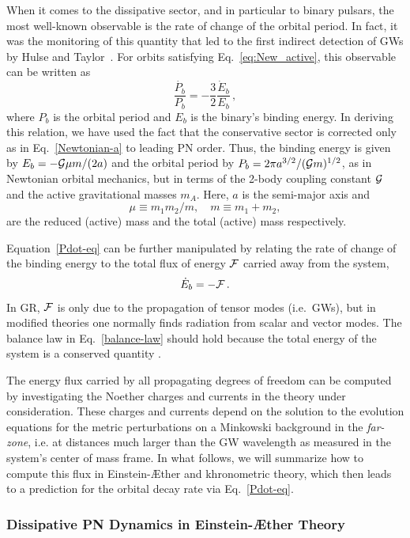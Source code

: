 \documentclass[prd,aps,twocolumn,nofootinbib,showpacs,superscriptaddress]{revtex4-1}
\newcommand\be{\begin{equation}}
\newcommand\ee{\end{equation}}
\begin{document}
When it comes to the dissipative sector, and in particular to binary pulsars, 
the most well-known observable is the rate of change
of the orbital period. In fact, it was the monitoring of this quantity that led to the 
first indirect detection of GWs by Hulse and 
Taylor~\cite{Hulse:1974eb,Taylor:1982zz,Taylor:1989sw}. For orbits satisfying Eq.~\eqref{eq:New_active}, this observable can be written as
%
\be
\label{Pdot-eq}
\frac{\dot{P_{b}}}{P_{b}} = - \frac{3}{2} \frac{\dot{E}_{b}}{E_{b}}\,,
\ee
% 
where $P_{b}$ is the orbital period and $E_{b}$ is the binary's binding energy. 
In deriving this relation, we have used the fact that the conservative
sector is corrected only as in Eq.~\eqref{Newtonian-a} to leading PN order.
Thus, the binding energy is given by $E_{b} = - {\cal{G}} \mu m/(2 a)$ and the orbital period
by $P_{b} = 2 \pi a^{3/2}/({\cal{G}} m)^{1/2}$, as in Newtonian orbital mechanics, but in terms
of the 2-body coupling constant ${\cal{G}}$ and the active gravitational masses $m_{A}$. Here, $a$ 
is the semi-major axis and
\be
\label{eq:defM}
\mu \equiv m_{1} m_{2}/m, \quad m \equiv m_{1} + m_{2},
\ee 
are the reduced (active) mass 
and the total (active) mass respectively.

Equation~\eqref{Pdot-eq} can be further manipulated 
by relating the rate of change of the binding energy to the total flux of energy ${\cal{F}}$ carried
away from the system, 
\be
\dot{E}_{b} = - {\cal{F}}\,.
\label{balance-law}
\ee 
In GR, $\cal{F}$ is only
due to the propagation of tensor modes (i.e.~GWs), but in modified theories one normally 
finds radiation from scalar and vector modes. The balance law in Eq.~\eqref{balance-law} 
should hold because the total energy of the system is a conserved quantity \cite{Blas:2011zd,Foster:2005fr,Eling:2005zq}.

The energy flux carried by all propagating degrees of freedom can be
computed by investigating the Noether charges and currents in the
theory under consideration. These charges and currents depend on the solution to the
evolution equations for the metric perturbations on a  Minkowski
background in the \textit{far-zone}, i.e. at distances much larger than the 
GW wavelength as measured in the system's center
of mass frame. In what follows, we will summarize how to compute this
flux in Einstein-\AE ther and khronometric theory, which then
leads to a prediction for the orbital decay rate via Eq.~\eqref{Pdot-eq}.

\subsubsection{Dissipative PN Dynamics in Einstein-\AE ther Theory}
\end{document}

